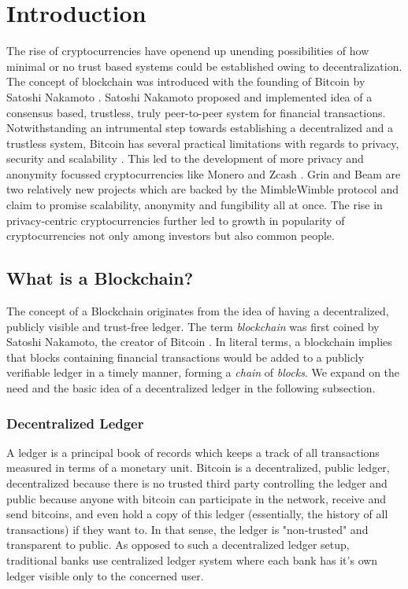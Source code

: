 
\newcommand{\etas}{\ensuremath{\eta_{\mathrm{s}}}}


\chapter{Introduction}

The rise of cryptocurrencies have openend up unending possibilities of how minimal or no trust based systems could be established owing to decentralization.
The concept of blockchain was introduced with the founding of Bitcoin by Satoshi Nakamoto \cite{Nakamoto2009}.
Satoshi Nakamoto proposed and implemented idea of a consensus based, trustless, truly peer-to-peer system for financial transactions.  
Notwithstanding an intrumental step towards establishing a decentralized and a trustless system, Bitcoin has several practical limitations with regards to privacy, security and scalability \cite{Conti2018}.   
This led to the development of more privacy and anonymity focussed cryptocurrencies like Monero \cite{Saberhagen2013} and Zcash \cite{Sasson2014}.
Grin \cite{GrinWebsite} and Beam \cite{BeamWebsite} are two relatively new projects which are backed by the MimbleWimble protocol \cite{Poelstra2016} and claim to promise scalability, anonymity and fungibility all at once.
The rise in privacy-centric cryptocurrencies further led to growth in popularity of cryptocurrencies not only among investors but also common people.


\section{What is a Blockchain?}
\label{scn:blockchain}

The concept of a Blockchain originates from the idea of having a decentralized, publicly visible and trust-free ledger.
The term \textit{blockchain} was first coined by Satoshi Nakamoto, the creator of Bitcoin \cite{Nakamoto2009}.
In literal terms, a blockchain implies that blocks containing financial transactions would be added to a publicly verifiable ledger in a timely manner, forming a \textit{chain} of \textit{blocks}.
We expand on the need and the basic idea of a decentralized ledger in the following subsection.

\subsection{Decentralized Ledger}

A ledger is a principal book of records which keeps a track of all transactions measured in terms of a monetary unit. Bitcoin is a decentralized, public ledger, decentralized because there is no trusted third party controlling the ledger and public because anyone with bitcoin can participate in the network, receive and send bitcoins, and even hold a copy of this ledger (essentially, the history of all transactions) if they want to. In that sense, the ledger is "non-trusted" and transparent to public. As opposed to such a decentralized ledger setup, traditional banks use centralized ledger system where each bank has it's own ledger visible only to the concerned user.\\ 

